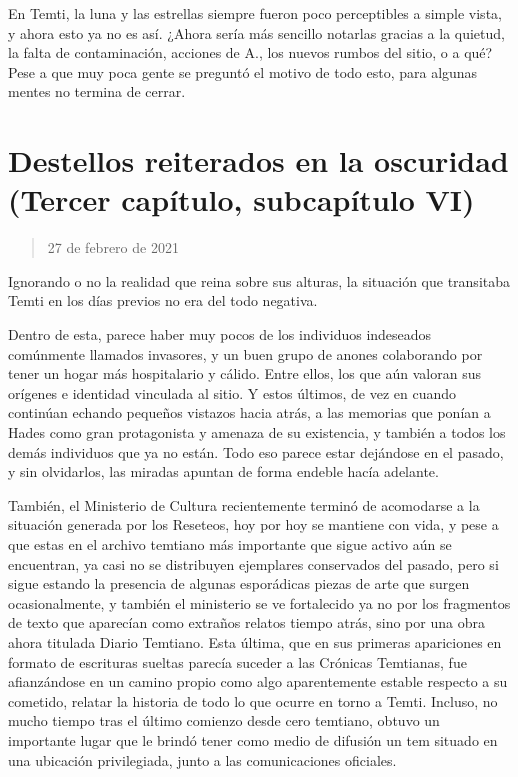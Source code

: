 \documentclass[
  spanish,
]{book}
\begin{document}
En Temti, la luna y las estrellas siempre fueron poco perceptibles a simple vista, y ahora esto ya no es así. ¿Ahora sería más sencillo notarlas gracias a la quietud, la falta de contaminación, acciones de A., los nuevos rumbos del sitio, o a qué? Pese a que muy poca gente se preguntó el motivo de todo esto, para algunas mentes no termina de cerrar.

\hypertarget{destellos-reiterados-en-la-oscuridad-tercer-capuxedtulo-subcapuxedtulo-vi}{%
\section{Destellos reiterados en la oscuridad (Tercer capítulo, subcapítulo VI)}\label{destellos-reiterados-en-la-oscuridad-tercer-capuxedtulo-subcapuxedtulo-vi}}

\begin{quote}
27 de febrero de 2021
\end{quote}

Ignorando o no la realidad que reina sobre sus alturas, la situación que transitaba Temti en los días previos no era del todo negativa.

Dentro de esta, parece haber muy pocos de los individuos indeseados comúnmente llamados invasores, y un buen grupo de anones colaborando por tener un hogar más hospitalario y cálido. Entre ellos, los que aún valoran sus orígenes e identidad vinculada al sitio. Y estos últimos, de vez en cuando continúan echando pequeños vistazos hacia atrás, a las memorias que ponían a Hades como gran protagonista y amenaza de su existencia, y también a todos los demás individuos que ya no están. Todo eso parece estar dejándose en el pasado, y sin olvidarlos, las miradas apuntan de forma endeble hacía adelante.

También, el Ministerio de Cultura recientemente terminó de acomodarse a la situación generada por los Reseteos, hoy por hoy se mantiene con vida, y pese a que estas en el archivo temtiano más importante que sigue activo aún se encuentran, ya casi no se distribuyen ejemplares conservados del pasado, pero si sigue estando la presencia de algunas esporádicas piezas de arte que surgen ocasionalmente, y también el ministerio se ve fortalecido ya no por los fragmentos de texto que aparecían como extraños relatos tiempo atrás, sino por una obra ahora titulada Diario Temtiano. Esta última, que en sus primeras apariciones en formato de escrituras sueltas parecía suceder a las Crónicas Temtianas, fue afianzándose en un camino propio como algo aparentemente estable respecto a su cometido, relatar la historia de todo lo que ocurre en torno a Temti. Incluso, no mucho tiempo tras el último comienzo desde cero temtiano, obtuvo un importante lugar que le brindó tener como medio de difusión un tem situado en una ubicación privilegiada, junto a las comunicaciones oficiales.
\end{document}
